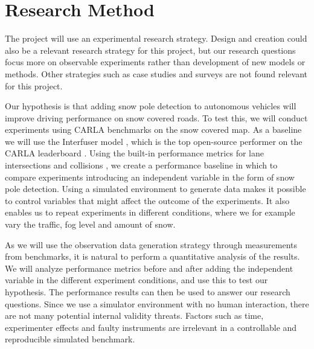 \section*{Research Method}
The project will use an experimental research strategy. Design and creation could also be a relevant research strategy for this project, but our research questions focus more on observable experiments rather than development of new models or methods. Other strategies such as case studies and surveys are not found relevant for this project.

Our hypothesis is that adding snow pole detection to autonomous vehicles will improve driving performance on snow covered roads. To test this, we will conduct experiments using CARLA benchmarks \cite{carla-driving-benchmark} on the snow covered map. As a baseline we will use the Interfuser model \cite{shao2022interfuser}, which is the top open-source performer on the CARLA leaderboard \cite{carla-leaderboard}. Using the built-in performance metrics for lane intersections and collisions \cite{carla-driving-benchmark-metrics}, we create a performance baseline in which to compare experiments introducing an independent variable in the form of snow pole detection. Using a simulated environment to generate data makes it possible to control variables that might affect the outcome of the experiments. It also enables us to repeat experiments in different conditions, where we for example vary the traffic, fog level and amount of snow.


As we will use the observation data generation strategy through measurements from benchmarks, it is natural to perform a quantitative analysis of the results. We will analyze performance metrics before and after adding the independent variable in the different experiment conditions, and use this to test our hypothesis. The performance results can then be used to answer our research questions. Since we use a simulator environment with no human interaction, there are not many potential internal validity threats. Factors such as time, experimenter effects and faulty instruments are irrelevant in a controllable and reproducible simulated benchmark.


